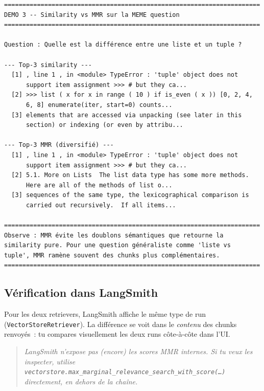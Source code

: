 \documentclass[11pt,a4paper]{article}
\begin{document}
\begin{tcolorbox}[
  colback=white,
  colframe=black!50,
  coltitle=black,
  fonttitle=\footnotesize\bfseries,
  fontupper=\footnotesize,
  title=Sortie de l'exécution,
  breakable,
]
\begin{verbatim}
======================================================================
DEMO 3 -- Similarity vs MMR sur la MEME question
======================================================================

Question : Quelle est la différence entre une liste et un tuple ?

--- Top-3 similarity ---
  [1] , line 1 , in <module> TypeError : 'tuple' object does not
      support item assignment >>> # but they ca...
  [2] >>> list ( x for x in range ( 10 ) if is_even ( x )) [0, 2, 4,
      6, 8] enumerate(iter, start=0) counts...
  [3] elements that are accessed via unpacking (see later in this
      section) or indexing (or even by attribu...

--- Top-3 MMR (diversifié) ---
  [1] , line 1 , in <module> TypeError : 'tuple' object does not
      support item assignment >>> # but they ca...
  [2] 5.1. More on Lists  The list data type has some more methods.
      Here are all of the methods of list o...
  [3] sequences of the same type, the lexicographical comparison is
      carried out recursively.  If all items...

======================================================================
Observe : MMR évite les doublons sémantiques que retourne la
similarity pure. Pour une question généraliste comme 'liste vs
tuple', MMR ramène souvent des chunks plus complémentaires.
======================================================================
\end{verbatim}
\end{tcolorbox}

\subsection{Vérification dans LangSmith}

Pour les deux retrievers, LangSmith affiche le même type de run
(\texttt{VectorStoreRetriever}). La différence se voit dans le
\emph{contenu} des chunks renvoyés~: tu compares visuellement les deux
runs côte-à-côte dans l'UI.

\begin{quote}\itshape
LangSmith n'expose pas (encore) les scores MMR internes. Si tu veux les
inspecter, utilise \texttt{vectorstore.max\_marginal\_relevance\_search\_with\_score(\dots)}
directement, en dehors de la chaîne.
\end{quote}
\end{document}
